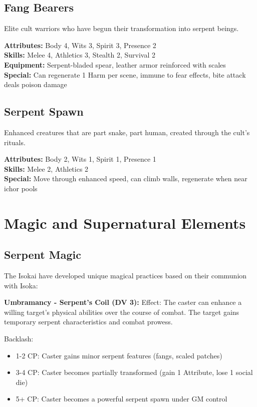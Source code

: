 \documentclass[12pt,twoside]{article}
\begin{document}
\subsection{Fang Bearers}

Elite cult warriors who have begun their transformation into serpent beings.

\textbf{Attributes:} Body 4, Wits 3, Spirit 3, Presence 2 \\
\textbf{Skills:} Melee 4, Athletics 3, Stealth 2, Survival 2 \\
\textbf{Equipment:} Serpent-bladed spear, leather armor reinforced with scales \\
\textbf{Special:} Can regenerate 1 Harm per scene, immune to fear effects, bite attack deals poison damage

\subsection{Serpent Spawn}

Enhanced creatures that are part snake, part human, created through the cult's rituals.

\textbf{Attributes:} Body 2, Wits 1, Spirit 1, Presence 1 \\
\textbf{Skills:} Melee 2, Athletics 2 \\
\textbf{Special:} Move through enhanced speed, can climb walls, regenerate when near ichor pools

\section{Magic and Supernatural Elements}

\subsection{Serpent Magic}

The Isokai have developed unique magical practices based on their communion with Isoka:

\textbf{Umbramancy - Serpent's Coil (DV 3):}
Effect: The caster can enhance a willing target's physical abilities over the course of combat. The target gains temporary serpent characteristics and combat prowess.

Backlash:
\begin{itemize}
  \item 1-2 CP: Caster gains minor serpent features (fangs, scaled patches)
  \item 3-4 CP: Caster becomes partially transformed (gain 1 Attribute, lose 1 social die)
  \item 5+ CP: Caster becomes a powerful serpent spawn under GM control
\end{itemize}
\end{document}
